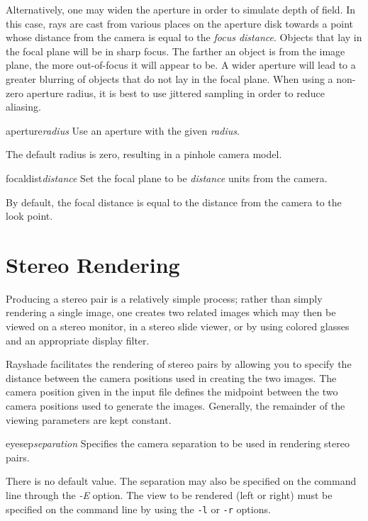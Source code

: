 Alternatively, one may widen the aperture in order to
simulate depth of field. In this case, rays are cast from various places on
the aperture disk towards a point whose distance from the
camera is equal to the
{\em focus distance}.  Objects that lay in the focal plane will be
in sharp focus.  The farther an object is from the image plane,
the more out-of-focus it will appear to be.
A wider aperture will lead to a greater blurring of
objects that do not lay in the focal plane.
When using a non-zero aperture radius, it is best to use jittered
sampling in order to reduce aliasing.

\begin{defkey}{aperture}{{\em radius}}
	Use an aperture with the given {\em radius}.
\end{defkey}
The default radius is zero, resulting in a pinhole camera model.

\begin{defkey}{focaldist}{{\em distance}}
	Set the focal plane to be {\em distance} units from the camera.
\end{defkey}
By default, the focal distance is equal to the distance from the
camera to the look point.

\section{Stereo Rendering}

Producing a stereo pair is a relatively simple process; rather than
simply rendering a single image, one creates two related images which
may then be viewed on a stereo monitor, in a stereo slide viewer, or
by using colored glasses and an appropriate display filter.

Rayshade facilitates the rendering of stereo pairs by allowing you
to specify the distance between the camera positions used in
creating the two images.  The camera position given in the
\rayshade input file
defines
the midpoint between the two camera positions used to generate the
images.
Generally, the remainder of the viewing parameters are kept constant.

\begin{defkey}{eyesep}{{\em separation}}
	Specifies the camera separation to be used in rendering stereo
	pairs.
\end{defkey}
There is no default value.
The separation may also be specified on the command line through
the {\em -E} option.
The view to be rendered (left or right)
must be specified on the command line by using
the {\tt -l} or {\tt -r} options.

